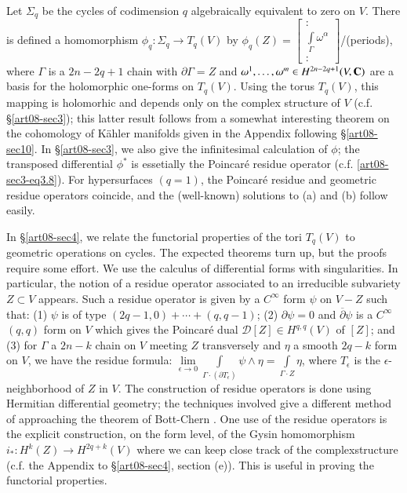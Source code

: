 Let $\Sigma_{q}$ be the cycles of codimension $q$ algebraically equivalent to zero on $V$. There is defined a homomorphism $\phi_{q}:\Sigma_{q}\to T_{q}(V)$ by $\phi_{q}(Z)=\left[\begin{smallmatrix}:\\ \int\limits_{\Gamma}\omega^{\alpha}\\ :\end{smallmatrix}\right]$/(periods), where $\Gamma$ is a $2n-2q+1$ chain with $\partial \Gamma=Z$ and $\omega^{1},\ldots,\omega^{m}\in H^{2n-2q+1}(V,\mathbf{C})$ are a basis for the holomorphic one-forms on $T_{q}(V)$. Using the torus $T_{q}(V)$, this mapping is holomorhic and depends only on the complex structure of $V$ (c.f. \S\ref{art08-sec3}); this latter result follows from a somewhat interesting theorem on the cohomology of K\"ahler manifolds given in the Appendix following \S\ref{art08-sec10}. In \S\ref{art08-sec3}, we also give the infinitesimal calculation of $\phi$; the transposed differential $\phi^{*}$ is essetially the Poincar\'e residue operator (c.f. \eqref{art08-sec3-eq3.8}). For hypersurfaces $(q=1)$, the Poincar\'e residue and geometric residue operators coincide, and the (well-known) solutions to (a) and (b) follow easily.

In \S\ref{art08-sec4}, we relate the functorial properties of the tori $T_{q}(V)$ to geometric operations on cycles. The expected theorems turn up, but the proofs require some effort. We use the calculus of differential forms with singularities. In particular, the notion of a residue operator associated to an irreducible subvariety $Z\subset V$ appears. Such a residue operator is given by a $C^{\infty}$ form $\psi$ on $V-Z$ such that: (1) $\psi$ is of type $(2q-1,0)+\cdots+(q,q-1)$; (2) $\partial \psi=0$ and $\overline{\partial}\psi$ is a $C^{\infty}$ $(q,q)$ form on $V$ which gives the Poincar\'e dual $\mathscr{D}[Z]\in H^{q,q}(V)$ of $[Z]$; and (3) for $\Gamma$ a $2n-k$ chain on $V$ meeting $Z$ transversely and $\eta$ a smooth $2q-k$ form on $V$, we have the residue formula: $\lim\limits_{\epsilon\to 0} \int\limits_{\Gamma\cdot (\partial T_{\epsilon})}\psi \wedge \eta=\int\limits_{\Gamma\cdot Z}\eta$, where $T_{\epsilon}$ is the $\epsilon$-neighborhood of $Z$ in $V$. The construction of residue operators is done using Hermitian differential geometry; the techniques involved give a different method of approaching the theorem of Bott-Chern \cite{art08-key4}. One use of the residue operators is the explicit construction, on the form level, of the Gysin homomorphism $i_{*}:H^{k}(Z)\to H^{2q+k}(V)$ where we can keep close track of the complex\pageoriginale structure (c.f. the Appendix to \S\ref{art08-sec4}, section (e)). This is useful in proving the functorial properties.

